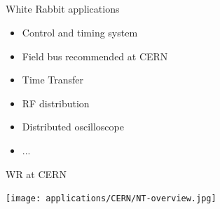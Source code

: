 \documentclass[compress,red]{beamer}
\begin{document}
\subsection{}
\begin{frame}{White Rabbit applications}

  \begin{itemize}
    \item Control and timing system
    \item Field bus recommended at CERN
    \item Time Transfer
    \item RF distribution
    \item Distributed oscilloscope
    \item ...
  \end{itemize}

\end{frame}
\begin{frame}{WR at CERN}

    \begin{center}
      \texttt{[image: applications/CERN/NT-overview.jpg]}
    \end{center}

\end{frame}
\end{document}
